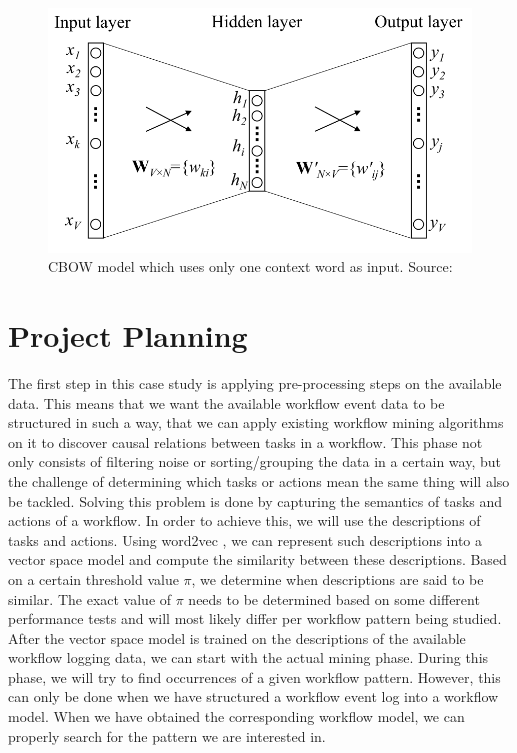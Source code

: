 \documentclass[a4paper,11pt]{article}
\begin{document}
\begin{figure}[h]
\centering
\includegraphics[width=.8\linewidth]{one-context-word.png}
\caption{CBOW model which uses only one context word as input. Source: \cite{Rong2014word2vec}}
\label{figure:one-context-word}
\end{figure}

\section{Project Planning}
The first step in this case study is applying pre-processing steps on the available data. This means that we want the available workflow event data to be structured in such a way, that we can apply existing workflow mining algorithms on it to discover causal relations between tasks in a workflow. This phase not only consists of filtering noise or sorting/grouping the data in a certain way, but the challenge of determining which tasks or actions mean the same thing will also be tackled. Solving this problem is done by capturing the semantics of tasks and actions of a workflow. In order to achieve this, we will use the descriptions of tasks and actions. Using word2vec \cite{Mikolov2013a,Mikolov2013b}, we can represent such descriptions into a vector space model and compute the similarity between these descriptions. Based on a certain threshold value $\pi$, we determine when descriptions are said to be similar. The exact value of $\pi$ needs to be determined based on some different performance tests and will most likely differ per workflow pattern being studied.
\\
After the vector space model is trained on the descriptions of the available workflow logging data, we can start with the actual mining phase. During this phase, we will try to find occurrences of a given workflow pattern. However, this can only be done when we have structured a workflow event log into a workflow model. When we have obtained the corresponding workflow model, we can properly search for the pattern we are interested in. 



\end{document}
